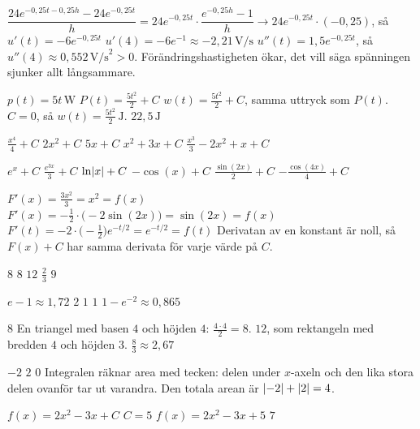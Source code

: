 
\begin{facit}

  $\dfrac{24e^{-0{,}25t - 0{,}25h} - 24e^{-0{,}25t}}{h}
= 24e^{-0{,}25t} \cdot \dfrac{e^{-0{,}25h} - 1}{h} \to 24e^{-0{,}25t} \cdot (-0{,}25)$, så
$u'(t) = -6e^{-0{,}25t}$
 $u'(4) = -6e^{-1} \approx -2{,}21\,\text{V/s}$
 $u''(t) = 1{,}5e^{-0{,}25t}$, så $u''(4) \approx 0{,}552\,\text{V/s}^2 > 0$.
Förändringshastigheten ökar, det vill säga spänningen sjunker allt långsammare.

  $p(t) = 5t\,\text{W}$  $P(t) = \frac{5t^2}{2} + C$
 $w(t) = \frac{5t^2}{2} + C$, samma uttryck som $P(t)$.
 $C = 0$, så $w(t) = \frac{5t^2}{2}\,\text{J}$.
 $22{,}5\,\text{J}$

  $\frac{x^4}{4} + C$  $2x^2 + C$  $5x + C$  $x^2 + 3x + C$
 $\frac{x^3}{3} - 2x^2 + x + C$

  $e^x + C$  $\frac{e^{3x}}{3} + C$  $\ln\lvert x\rvert + C$
 $-\cos(x) + C$  $\frac{\sin(2x)}{2} + C$  $-\frac{\cos(4x)}{4} + C$

  $F'(x) = \frac{3x^2}{3} = x^2 = f(x)$
 $F'(x) = -\frac{1}{2} \cdot \bigl(-2\sin(2x)\bigr) = \sin(2x) = f(x)$
 $F'(t) = -2 \cdot \bigl(-\frac{1}{2}\bigr)e^{-t/2} = e^{-t/2} = f(t)$
 Derivatan av en konstant är noll, så $F(x) + C$ har samma derivata för varje värde på $C$.

  $8$  $8$  $12$  $\frac{2}{3}$  $9$

  $e - 1 \approx 1{,}72$  $2$  $1$  $1$
 $1 - e^{-2} \approx 0{,}865$

  $8$  En triangel med basen $4$ och höjden $4$: $\frac{4 \cdot 4}{2} = 8$.
 $12$, som rektangeln med bredden $4$ och höjden $3$.  $\frac{8}{3} \approx 2{,}67$

  $-2$  $2$  $0$
 Integralen räknar area med tecken: delen under $x$-axeln och den lika stora delen ovanför
tar ut varandra. Den totala arean är $\lvert-2\rvert + \lvert2\rvert = 4$.

  $f(x) = 2x^2 - 3x + C$  $C = 5$  $f(x) = 2x^2 - 3x + 5$  $7$


\end{facit}
